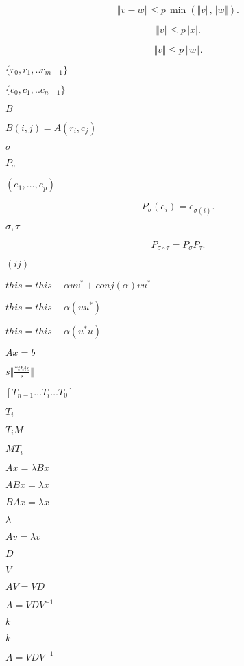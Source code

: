 \documentclass{article}
\begin{document}
\[ \Vert v - w \Vert \leqslant p\,\min(\Vert v\Vert, \Vert w\Vert). \]
\pagebreak

\[ \Vert v \Vert \leqslant p\,\vert x\vert. \]
\pagebreak

\[ \Vert v \Vert \leqslant p\,\Vert w\Vert. \]
\pagebreak

$
\{r_0,r_1,..r_{m-1}\} $
\pagebreak

$ \{c_0,c_1,..c_{n-1} \}$
\pagebreak

$ B $
\pagebreak

$ B(i,j) = A(r_i,c_j)
$
\pagebreak

$ \sigma $
\pagebreak

$ P_\sigma $
\pagebreak

$ (e_1,\ldots,e_p) $
\pagebreak

\[ P_\sigma(e_i) = e_{\sigma(i)}. \]
\pagebreak

$ \sigma, \tau $
\pagebreak

\[ P_{\sigma\circ\tau} = P_\sigma P_\tau. \]
\pagebreak

$(ij)$
\pagebreak

$ this = this + \alpha u v^* + conj(\alpha) v u^* $
\pagebreak

$ this = this + \alpha ( u u^* ) $
\pagebreak

$ this = this + \alpha ( u^* u ) $
\pagebreak

$ A x = b $
\pagebreak

$ s \Vert \frac{*this}{s} \Vert $
\pagebreak

$[T_{n-1} \ldots T_{i} \ldots T_{0}]$
\pagebreak

$ T_{i} $
\pagebreak

$ T_{i} M$
\pagebreak

$ M T_{i}$
\pagebreak

$ Ax = \lambda B x $
\pagebreak

$ ABx = \lambda x $
\pagebreak

$ BAx = \lambda x $
\pagebreak

$ \lambda $
\pagebreak

$ Av = \lambda v
$
\pagebreak

$ D $
\pagebreak

$ V $
\pagebreak

$ A V = V D $
\pagebreak

$ A = V D V^{-1}
$
\pagebreak

$ k $
\pagebreak

$ k
$
\pagebreak

$ A = V D
V^{-1} $
\pagebreak
\end{document}

